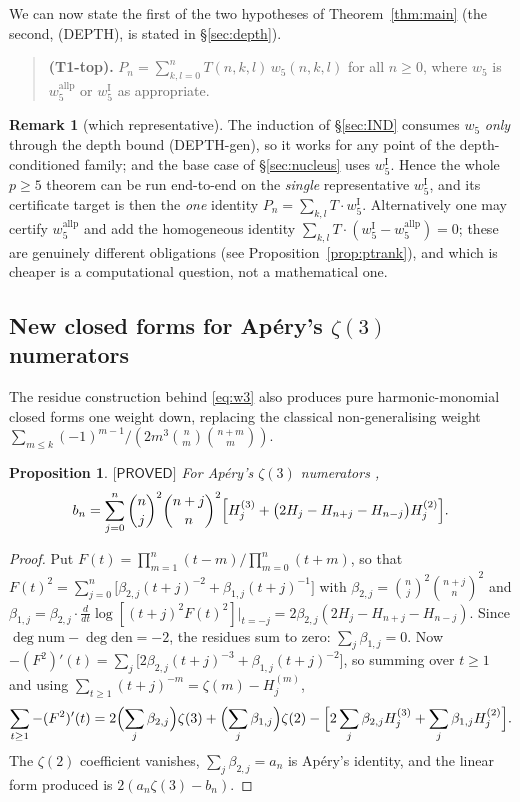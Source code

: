 \documentclass[11pt,reqno]{amsart}
\theoremstyle{plain}
\newtheorem{proposition}[theorem]{Proposition}
\theoremstyle{definition}
\newtheorem{remark}[theorem]{Remark}
\theoremstyle{remark}
\numberwithin{equation}{section}
\newcommand{\wfive}{w_5}
\newcommand{\PROVED}{\textsf{[PROVED]}}
\begin{document}
\noindent We can now state the first of the two hypotheses of Theorem~\ref{thm:main} (the
second, (DEPTH), is stated in \S\ref{sec:depth}).

\begin{quote}
\textbf{(T1-top).} $P_n=\displaystyle\sum_{k,l=0}^{n}T(n,k,l)\,\wfive(n,k,l)$ for all $n\ge0$,
where $\wfive$ is $w_5^{\mathrm{allp}}$ or $w_5^{\mathrm I}$ as appropriate.
\end{quote}

\begin{remark}[which representative]\label{rem:onerep}
The induction of \S\ref{sec:IND} consumes $\wfive$ \emph{only} through the depth bound
(DEPTH-gen), so it works for any point of the depth-conditioned family; and the base case of
\S\ref{sec:nucleus} uses $w_5^{\mathrm I}$. Hence the whole $p\ge5$ theorem can be run
end-to-end on the \emph{single} representative $w_5^{\mathrm I}$, and its certificate target is
then the \emph{one} identity $P_n=\sum_{k,l}T\cdot w_5^{\mathrm I}$. Alternatively one may
certify $w_5^{\mathrm{allp}}$ and add the homogeneous identity
$\sum_{k,l}T\cdot(w_5^{\mathrm I}-w_5^{\mathrm{allp}})=0$; these are genuinely different
obligations (see Proposition~\ref{prop:ptrank}), and which is cheaper is a computational
question, not a mathematical one.
\end{remark}

\subsection{New closed forms for Ap\'ery's \texorpdfstring{$\zeta(3)$}{zeta(3)} numerators}\label{sec:apery}

The residue construction behind \eqref{eq:w3} also produces pure harmonic-monomial closed forms
one weight down, replacing the classical non-generalising weight
$\sum_{m\le k}(-1)^{m-1}/(2m^3\binom nm\binom{n+m}{m})$.

\begin{proposition}\label{prop:apery-b}
$\PROVED$ For Ap\'ery's $\zeta(3)$ numerators \cite{Ap79},
\[
b_n=\sum_{j=0}^{n}\binom nj^2\binom{n+j}{n}^2
\Bigl[H^{(3)}_j+\bigl(2H_j-H_{n+j}-H_{n-j}\bigr)H^{(2)}_j\Bigr].
\]
\end{proposition}

\begin{proof}
Put $F(t)=\prod_{m=1}^{n}(t-m)\big/\prod_{m=0}^{n}(t+m)$, so that
$F(t)^2=\sum_{j=0}^{n}\bigl[\beta_{2,j}(t+j)^{-2}+\beta_{1,j}(t+j)^{-1}\bigr]$ with
$\beta_{2,j}=\binom nj^2\binom{n+j}{n}^2$ and
$\beta_{1,j}=\beta_{2,j}\cdot\frac{d}{dt}\log[(t+j)^2F(t)^2]\big|_{t=-j}
=2\beta_{2,j}(2H_j-H_{n+j}-H_{n-j})$. Since $\deg\mathrm{num}-\deg\mathrm{den}=-2$, the
residues sum to zero: $\sum_j\beta_{1,j}=0$. Now
$-(F^2)'(t)=\sum_j\bigl[2\beta_{2,j}(t+j)^{-3}+\beta_{1,j}(t+j)^{-2}\bigr]$, so summing over
$t\ge1$ and using $\sum_{t\ge1}(t+j)^{-m}=\zeta(m)-H^{(m)}_j$,
\[
\sum_{t\ge1}-(F^2)'(t)=2\Bigl(\sum_j\beta_{2,j}\Bigr)\zeta(3)+\Bigl(\sum_j\beta_{1,j}\Bigr)\zeta(2)
-\Bigl[2\sum_j\beta_{2,j}H^{(3)}_j+\sum_j\beta_{1,j}H^{(2)}_j\Bigr].
\]
The $\zeta(2)$ coefficient vanishes, $\sum_j\beta_{2,j}=a_n$ is Ap\'ery's identity, and the
linear form produced is $2(a_n\zeta(3)-b_n)$.
\end{proof}
\end{document}
